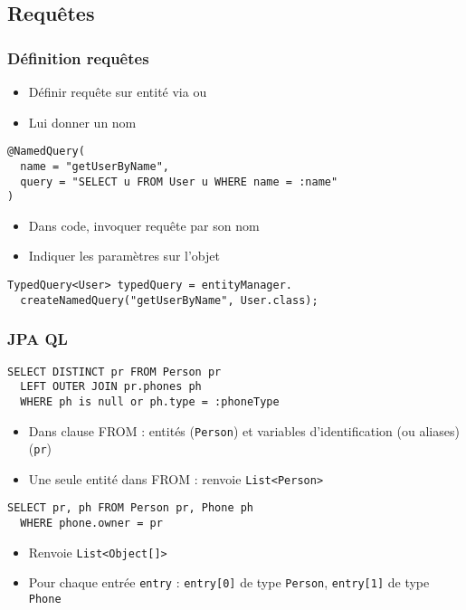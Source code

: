 \documentclass[english, french]{beamer}
\begin{document}
\subsection{Requêtes}
\begin{frame}[fragile]
	\frametitle{Définition requêtes}
	\begin{itemize}
		\item Définir requête sur entité via  {\tiny ou  }
		\item Lui donner un nom
	\end{itemize}
	\begin{lstlisting}
@NamedQuery(
  name = "getUserByName",
  query = "SELECT u FROM User u WHERE name = :name"
)
	\end{lstlisting}
	\begin{itemize}
		\item Dans code, invoquer requête par son nom
		\item Indiquer les paramètres sur l’objet 
	\end{itemize}
	\begin{lstlisting}
TypedQuery<User> typedQuery = entityManager.
  createNamedQuery("getUserByName", User.class);
	\end{lstlisting}
\end{frame}

\begin{frame}[fragile]
	\frametitle{JPA QL}
	\begin{lstlisting}
SELECT DISTINCT pr FROM Person pr 
  LEFT OUTER JOIN pr.phones ph 
  WHERE ph is null or ph.type = :phoneType
	\end{lstlisting}
	\begin{itemize}
		\item Dans clause FROM : entités (\texttt{Person}) et variables d’identification (ou aliases) (\texttt{pr})
		\item Une seule entité dans FROM : renvoie \texttt{List<Person>}
	\end{itemize}
	\begin{lstlisting}
SELECT pr, ph FROM Person pr, Phone ph 
  WHERE phone.owner = pr
	\end{lstlisting}
	\begin{itemize}
		\item Renvoie \texttt{List<Object[]>}
		\item Pour chaque entrée \texttt{entry} : \texttt{entry[0]} de type \texttt{Person}, \texttt{entry[1]} de type \texttt{Phone}
	\end{itemize}
\end{frame}
\end{document}
